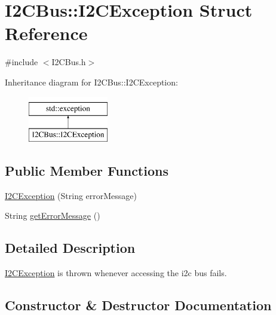 \hypertarget{structI2CBus_1_1I2CException}{}\section{I2\+C\+Bus\+:\+:I2\+C\+Exception Struct Reference}
\label{structI2CBus_1_1I2CException}


{\ttfamily \#include $<$I2\+C\+Bus.\+h$>$}

Inheritance diagram for I2\+C\+Bus\+:\+:I2\+C\+Exception\+:\begin{figure}[H]
\begin{center}
\leavevmode
\includegraphics[height=2.000000cm]{structI2CBus_1_1I2CException}
\end{center}
\end{figure}
\subsection*{Public Member Functions}
\begin{DoxyCompactItemize}
\item 
\mbox{\hyperlink{structI2CBus_1_1I2CException_a4713213f81f8f59783d4f15b9b663938}{I2\+C\+Exception}} (String error\+Message)
\item 
String \mbox{\hyperlink{structI2CBus_1_1I2CException_ab7ca1648faf3309155c22aec12019b10}{get\+Error\+Message}} ()
\end{DoxyCompactItemize}


\subsection{Detailed Description}
\mbox{\hyperlink{structI2CBus_1_1I2CException}{I2\+C\+Exception}} is thrown whenever accessing the i2c bus fails. 

\subsection{Constructor \& Destructor Documentation}
\mbox{\label{structI2CBus_1_1I2CException_a4713213f81f8f59783d4f15b9b663938}} 
